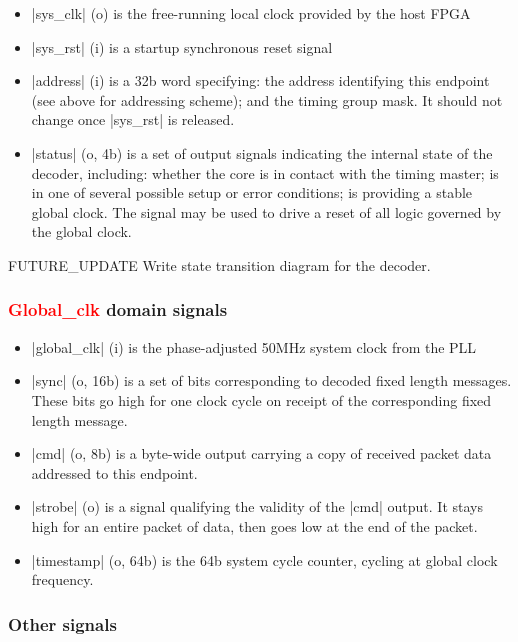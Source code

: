 \documentclass[a4paper,11pt]{article}
\begin{document}
\begin{itemize}
	\item |sys_clk| (o) is the free-running local clock provided by the host FPGA
	\item |sys_rst| (i) is a startup synchronous reset signal
	\item |address| (i) is a 32b word specifying: the address identifying this endpoint (see above for addressing scheme); and the timing group mask. It should not change once |sys_rst| is released.
	\item |status| (o, 4b) is a set of output signals indicating the internal state of the decoder, including: whether the core is in contact with the timing master; is in one of several possible setup or error conditions; is providing a stable global clock. The signal may be used to drive a reset of all logic governed by the global clock.
\end{itemize}

{\color{red}FUTURE\_UPDATE} Write state transition diagram for the decoder.

\subsubsection{\textcolor{red}{Global\_clk} domain signals}

\begin{itemize}
	\item |global_clk| (i) is the phase-adjusted 50MHz system clock from the PLL
	\item |sync| (o, 16b) is a set of bits corresponding to decoded fixed length messages. These bits go high for one clock cycle on receipt of the corresponding fixed length message.
	\item |cmd| (o, 8b) is a byte-wide output carrying a copy of received packet data addressed to this endpoint.
	\item |strobe| (o) is a signal qualifying the validity of the |cmd| output. It stays high for an entire packet of data, then goes low at the end of the packet.
	\item |timestamp| (o, 64b) is the 64b system cycle counter, cycling at global clock frequency.
\end{itemize}

\subsubsection{Other signals}
\end{document}
